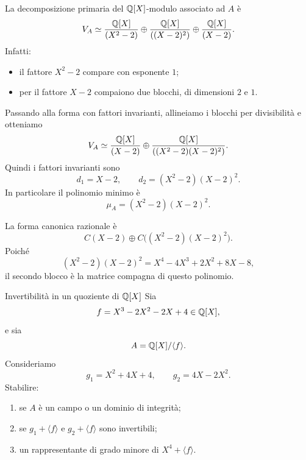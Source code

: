 \documentclass[a4paper]{article}
\begin{document}
\begin{radioactive}
\begin{snippetsolution}{}
    La decomposizione primaria del \(\mathbb{Q}[X]\)-modulo associato ad \(A\) è
    \[
        V_A
        \simeq
        \frac{\mathbb{Q}[X]}{(X^2-2)}
        \oplus
        \frac{\mathbb{Q}[X]}{((X-2)^2)}
        \oplus
        \frac{\mathbb{Q}[X]}{(X-2)}.
    \]
    Infatti:
    \begin{itemize}
        \item il fattore \(X^2-2\) compare con esponente \(1\);
        \item per il fattore \(X-2\) compaiono due blocchi, di dimensioni \(2\) e \(1\).
    \end{itemize}

    Passando alla forma con fattori invarianti, allineiamo i blocchi per divisibilità e otteniamo
    \[
        V_A
        \simeq
        \frac{\mathbb{Q}[X]}{(X-2)}
        \oplus
        \frac{\mathbb{Q}[X]}{((X^2-2)(X-2)^2)}.
    \]
    Quindi i fattori invarianti sono
    \[
        d_1=X-2,
        \qquad
        d_2=(X^2-2)(X-2)^2.
    \]
    In particolare il polinomio minimo è
    \[
        \mu_A=(X^2-2)(X-2)^2.
    \]

    La forma canonica razionale è
    \[
        C(X-2)\oplus C\big((X^2-2)(X-2)^2\big).
    \]
    Poiché
    \[
        (X^2-2)(X-2)^2
        =
        X^4-4X^3+2X^2+8X-8,
    \]
    il secondo blocco è la matrice compagna di questo polinomio.
\end{snippetsolution}
\end{radioactive}

\begin{radioactive}
\begin{snippetexercise}{Invertibilità in un quoziente di \(\mathbb{Q}[X]\)}
    Sia
    \[
        f=X^3-2X^2-2X+4\in\mathbb{Q}[X],
    \]
    e sia
    \[
        A=\mathbb{Q}[X]/\langle f \rangle.
    \]
    Consideriamo
    \[
        g_1=X^2+4X+4,
        \qquad
        g_2=4X-2X^2.
    \]
    Stabilire:
    \begin{enumerate}
        \item se \(A\) è un campo o un dominio di integrità;
        \item se \(g_1+\langle f \rangle\) e \(g_2+\langle f \rangle\) sono invertibili;
        \item un rappresentante di grado minore di \(X^4+\langle f \rangle\).
    \end{enumerate}
\end{snippetexercise}
\end{radioactive}
\end{document}
